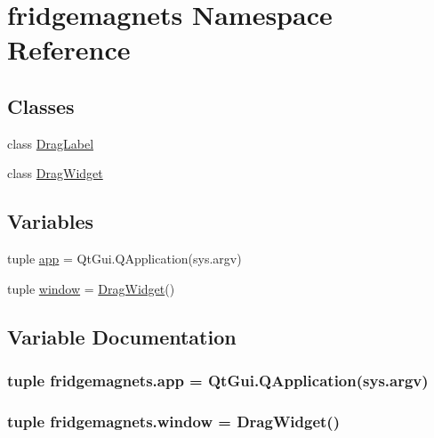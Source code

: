 \hypertarget{namespacefridgemagnets}{}\section{fridgemagnets Namespace Reference}
\label{namespacefridgemagnets}
\subsection*{Classes}
\begin{DoxyCompactItemize}
\item 
class \hyperlink{classfridgemagnets_1_1DragLabel}{Drag\+Label}
\item 
class \hyperlink{classfridgemagnets_1_1DragWidget}{Drag\+Widget}
\end{DoxyCompactItemize}
\subsection*{Variables}
\begin{DoxyCompactItemize}
\item 
tuple \hyperlink{namespacefridgemagnets_aa681c1bd1905e88dc1b23f7643447c9e}{app} = Qt\+Gui.\+Q\+Application(sys.\+argv)
\item 
tuple \hyperlink{namespacefridgemagnets_aff690c9fc5f248d7547e171798081a08}{window} = \hyperlink{classfridgemagnets_1_1DragWidget}{Drag\+Widget}()
\end{DoxyCompactItemize}


\subsection{Variable Documentation}
\hypertarget{namespacefridgemagnets_aa681c1bd1905e88dc1b23f7643447c9e}{}
\subsubsection[{app}]{\setlength{\rightskip}{0pt plus 5cm}tuple fridgemagnets.\+app = Qt\+Gui.\+Q\+Application(sys.\+argv)}\label{namespacefridgemagnets_aa681c1bd1905e88dc1b23f7643447c9e}
\hypertarget{namespacefridgemagnets_aff690c9fc5f248d7547e171798081a08}{}
\subsubsection[{window}]{\setlength{\rightskip}{0pt plus 5cm}tuple fridgemagnets.\+window = {\bf Drag\+Widget}()}\label{namespacefridgemagnets_aff690c9fc5f248d7547e171798081a08}
